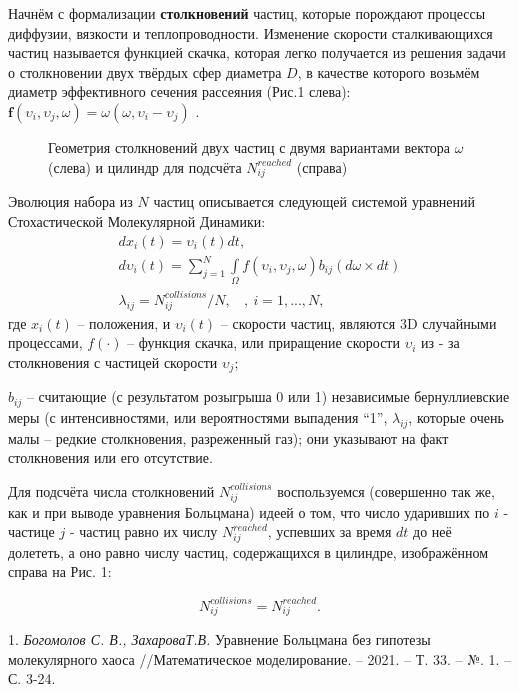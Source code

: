 Начнём с формализации \textbf{столкновений} частиц, которые порождают процессы диффузии, вязкости и теплопроводности.  Изменение скорости сталкивающихся частиц называется функцией скачка, которая легко получается из решения задачи о столкновении двух твёрдых сфер диаметра $ D $, в качестве которого возьмём диаметр эффективного сечения рассеяния (Рис.1 слева):
$\textbf{f}(\textbf{$\upsilon_{i}$},\textbf{$\upsilon_{j}$},\textbf{$\omega$}) = \textbf{$\omega$} (\textbf{$\omega$},\textbf{$\upsilon_{i}$} - \textbf{$\upsilon_{j}$})$ .\\
\begin{figure}[h!]%
	\caption{Геометрия столкновений двух частиц с двумя вариантами вектора $\omega$ (слева) и цилиндр для подсчёта $N_{ij}^{reached}$ (справа)}
\end{figure}

Эволюция набора из $N$ частиц описывается следующей системой  уравнений Стохастической Молекулярной Динамики:
\begin{eqnarray}\label{SMD}
	 dx_{i}(t) = \upsilon_{i}(t) dt ,\ \ \  \nonumber \\
	 d\upsilon_{i}(t) = \sum\limits_{j=1}^N\int \limits_\Omega f(\upsilon_{i},\upsilon_{j},\omega)b_{ij}(d\omega\times dt) %
	 \\
	 \lambda_{ij} =N_{ij}^{collisions}/N , \ \ \ \ , \ i=1,...,N,\nonumber
  \end{eqnarray}
  где $x_{i}(t)$ -- положения, и $\upsilon_{i}(t)$ -- скорости частиц, являются 3D случайными процессами,
 $f(\cdot)$ -- функция скачка, или приращение скорости $\upsilon_{i}$ из - за столкновения с частицей скорости $\upsilon_{j}$;

 $b_{ij}$ -- считающие (с результатом розыгрыша 0 или 1) независимые бернуллиевские меры (с интенсивностями, или вероятностями выпадения ``1'',  $\lambda_{ij}$, которые  очень малы -- редкие столкновения, разреженный газ); они указывают на факт столкновения или его отсутствие.



Для подсчёта числа столкновений $N_{ij}^{collisions}$  воспользуемся  (совершенно так же, как и при выводе уравнения Больцмана)
идеей о том, что число ударивших по $ i $ - частице  $ j $ - частиц равно их числу $N_{ij}^{reached}$, успевших за  время $ dt $ до неё долететь,
а оно равно числу частиц, содержащихся в  цилиндре, изображённом справа на Рис. 1: %

 \begin{equation}\label{Nreached}
 N_{ij}^{collisions} = N_{ij}^{reached}.
\end{equation}




\litlist

1. {\it Богомолов С. В., ЗахароваТ.В.}
 Уравнение Больцмана без гипотезы молекулярного хаоса //Математическое моделирование. – 2021. – Т. 33. – №. 1. – С. 3-24.
